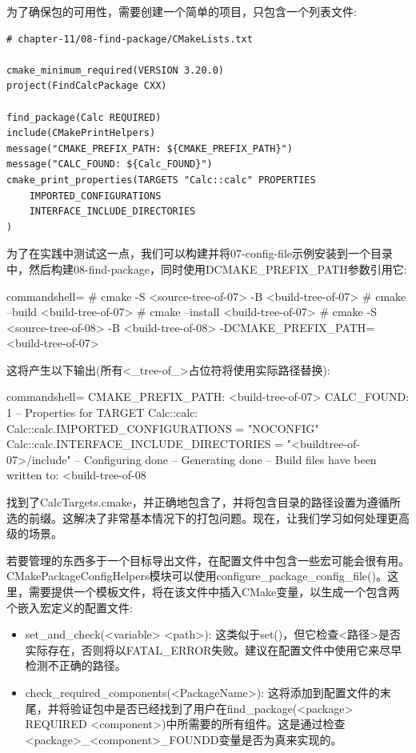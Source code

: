 为了确保包的可用性，需要创建一个简单的项目，只包含一个列表文件:

\begin{lstlisting}[style=styleCMake]
# chapter-11/08-find-package/CMakeLists.txt

cmake_minimum_required(VERSION 3.20.0)
project(FindCalcPackage CXX)

find_package(Calc REQUIRED)
include(CMakePrintHelpers)
message("CMAKE_PREFIX_PATH: ${CMAKE_PREFIX_PATH}")
message("CALC_FOUND: ${Calc_FOUND}")
cmake_print_properties(TARGETS "Calc::calc" PROPERTIES
	IMPORTED_CONFIGURATIONS
	INTERFACE_INCLUDE_DIRECTORIES
)
\end{lstlisting}

为了在实践中测试这一点，我们可以构建并将07-config-file示例安装到一个目录中，然后构建08-find-package，同时使用DCMAKE\_PREFIX\_PATH参数引用它:

\begin{tcblisting}{commandshell={}}
# cmake -S <source-tree-of-07> -B <build-tree-of-07>
# cmake --build <build-tree-of-07>
# cmake --install <build-tree-of-07>
# cmake -S <source-tree-of-08> -B <build-tree-of-08>
  -DCMAKE_PREFIX_PATH=<build-tree-of-07>
\end{tcblisting}

这将产生以下输出(所有<\_tree-of\_>占位符将使用实际路径替换):

\begin{tcblisting}{commandshell={}}
CMAKE_PREFIX_PATH: <build-tree-of-07>
CALC_FOUND: 1
--
  Properties for TARGET Calc::calc:
    Calc::calc.IMPORTED_CONFIGURATIONS = "NOCONFIG"
    Calc::calc.INTERFACE_INCLUDE_DIRECTORIES = 
      "<buildtree-of-07>/include"
-- Configuring done
-- Generating done
-- Build files have been written to: <build-tree-of-08
\end{tcblisting}

找到了CalcTargets.cmake，并正确地包含了，并将包含目录的路径设置为遵循所选的前缀。这解决了非常基本情况下的打包问题。现在，让我们学习如何处理更高级的场景。


若要管理的东西多于一个目标导出文件，在配置文件中包含一些宏可能会很有用。CMakePackageConfigHelpers模块可以使用configure\_package\_config\_file()。这里，需要提供一个模板文件，将在该文件中插入CMake变量，以生成一个包含两个嵌入宏定义的配置文件:

\begin{itemize}
\item 
set\_and\_check(<variable> <path>): 这类似于set()，但它检查<路径>是否实际存在，否则将以FATAL\_ERROR失败。建议在配置文件中使用它来尽早检测不正确的路径。

\item 
check\_required\_components(<PackageName>): 这将添加到配置文件的末尾，并将验证包中是否已经找到了用户在find\_package(<package> REQUIRED  <component>)中所需要的所有组件。这是通过检查<package>\_<component>\_FOUNDD变量是否为真来实现的。
\end{itemize}

